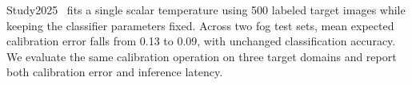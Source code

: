 Study2025~\cite{study2025} fits a single scalar temperature using 500 labeled target images while keeping the classifier parameters fixed. Across two fog test sets, mean expected calibration error falls from 0.13 to 0.09, with unchanged classification accuracy. We evaluate the same calibration operation on three target domains and report both calibration error and inference latency.
